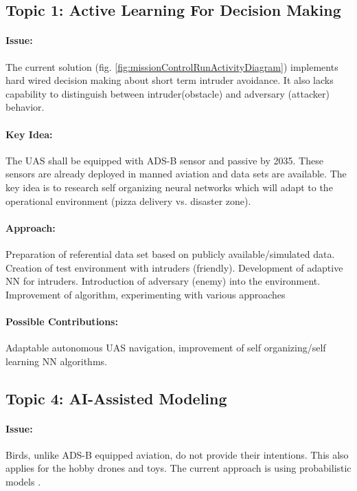 \documentclass[a4paper,narrowmargins,11pt,oneside,onehalfspaced,singlespacednotes]{fcup-thesis}
\theoremstyle{plain}
\theoremstyle{plain}
\theoremstyle{remark}
\begin{document}
\subsection*{Topic 1: Active Learning For Decision Making}
\paragraph{Issue:} The current solution (fig. \ref{fig:missionControlRunActivityDiagram}) implements hard wired decision making about short term intruder avoidance. It also lacks capability to distinguish between intruder(obstacle) and adversary (attacker) behavior.

\paragraph{Key Idea:} The UAS shall be equipped with ADS-B sensor and passive by 2035. These sensors are already deployed in manned aviation and data sets are available. The key idea is to research self organizing neural networks which will adapt to the operational environment (pizza delivery vs. disaster zone).

\paragraph{Approach:} Preparation of referential data set based on publicly available/simulated data. Creation of test environment with intruders (friendly). Development of adaptive NN for intruders. Introduction of adversary (enemy) into the environment. Improvement of algorithm, experimenting with various approaches


\paragraph{Possible Contributions:} Adaptable autonomous UAS navigation, improvement of self organizing/self learning NN algorithms.

\subsection*{Topic 4: AI-Assisted Modeling}
\paragraph{Issue:} Birds, unlike ADS-B equipped aviation, do not provide their intentions. This also applies for the hobby drones and toys. The current approach \cite{prevot2016uas} is using probabilistic models \cite{gomola2017probabilistic}.
 
\end{document}
